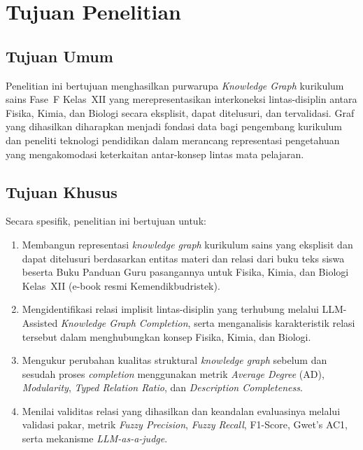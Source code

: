 \documentclass[../../thesis]{subfiles}
\begin{document}
\section{Tujuan Penelitian}

\subsection{Tujuan Umum}

Penelitian ini bertujuan menghasilkan purwarupa \textit{Knowledge Graph}
kurikulum sains Fase~F Kelas~XII yang merepresentasikan interkoneksi
lintas-disiplin antara Fisika, Kimia, dan Biologi secara eksplisit, dapat
ditelusuri, dan tervalidasi. Graf yang dihasilkan diharapkan menjadi fondasi
data bagi pengembang kurikulum dan peneliti teknologi pendidikan dalam merancang
representasi pengetahuan yang mengakomodasi keterkaitan antar-konsep lintas mata
pelajaran.

\subsection{Tujuan Khusus}

Secara spesifik, penelitian ini bertujuan untuk:

\begin{enumerate}
  \item Membangun representasi \textit{knowledge graph} kurikulum sains yang
        eksplisit dan dapat ditelusuri berdasarkan entitas materi dan relasi dari
        buku teks siswa beserta Buku Panduan Guru pasangannya untuk Fisika,
        Kimia, dan Biologi Kelas~XII (e-book resmi Kemendikbudristek).

  \item Mengidentifikasi relasi implisit lintas-disiplin yang terhubung melalui
        LLM-Assisted \textit{Knowledge Graph Completion}, serta menganalisis
        karakteristik relasi tersebut dalam menghubungkan konsep Fisika, Kimia,
        dan Biologi.

  \item Mengukur perubahan kualitas struktural \textit{knowledge graph} sebelum
        dan sesudah proses \textit{completion} menggunakan metrik
        \textit{Average Degree} (AD), \textit{Modularity},
        \textit{Typed Relation Ratio}, dan \textit{Description Completeness}.

  \item Menilai validitas relasi yang dihasilkan dan keandalan evaluasinya
        melalui validasi pakar, metrik \textit{Fuzzy Precision},
        \textit{Fuzzy Recall}, F1-Score, Gwet's AC1, serta mekanisme
        \textit{LLM-as-a-judge}.
\end{enumerate}
\end{document}
